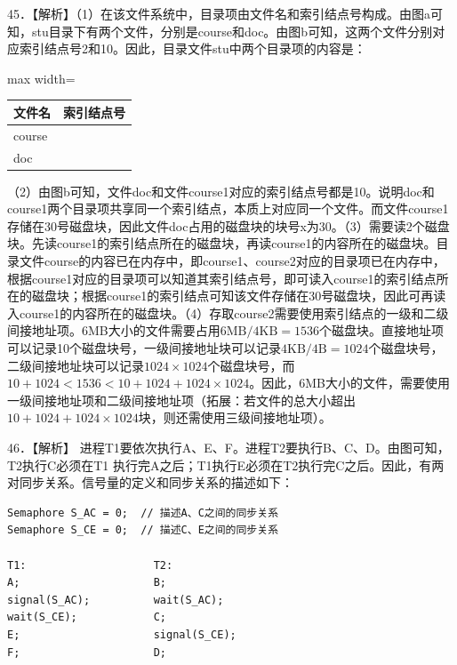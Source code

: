 \documentclass[UTF8,11pt]{ctexart}
\begin{document}
45．【解析】（1）在该文件系统中，目录项由文件名和索引结点号构成。由图a可知，stu目录下有两个文件，分别是course和doc。由图b可知，这两个文件分别对应索引结点号2和10。因此，目录文件stu中两个目录项的内容是：


\begin{center}\begin{adjustbox}{max width=\linewidth}\begin{tabular}{|>{\raggedright\arraybackslash}p{\dimexpr(\linewidth-4\tabcolsep-3\arrayrulewidth)/2\relax}|>{\raggedright\arraybackslash}p{\dimexpr(\linewidth-4\tabcolsep-3\arrayrulewidth)/2\relax}|}\hline
文件名 & 索引结点号\\\hline
course & 2\\\hline
doc & 10\\\hline\end{tabular}\end{adjustbox}\end{center}

（2）由图b可知，文件doc和文件course1对应的索引结点号都是10。说明doc和course1两个目录项共享同一个索引结点，本质上对应同一个文件。而文件course1存储在30号磁盘块，因此文件doc占用的磁盘块的块号x为30。（3）需要读2个磁盘块。先读course1的索引结点所在的磁盘块，再读course1的内容所在的磁盘块。目录文件course的内容已在内存中，即course1、course2对应的目录项已在内存中，根据course1对应的目录项可以知道其索引结点号，即可读入course1的索引结点所在的磁盘块；根据course1的索引结点可知该文件存储在30号磁盘块，因此可再读入course1的内容所在的磁盘块。（4）存取course2需要使用索引结点的一级和二级间接地址项。6MB大小的文件需要占用\(\displaystyle 6\mathrm{MB}/4\mathrm{KB}=1536\)个磁盘块。直接地址项可以记录10个磁盘块号，一级间接地址块可以记录\(\displaystyle 4\mathrm{KB}/4\mathrm{B}=1024\)个磁盘块号，二级间接地址块可以记录\(\displaystyle 1024\times1024\)个磁盘块号，而\(\displaystyle 10+1024<1536<10+1024+1024\times1024\)。因此，6MB大小的文件，需要使用一级间接地址项和二级间接地址项（拓展：若文件的总大小超出\(\displaystyle 10+1024+1024\times1024\)块，则还需使用三级间接地址项）。


46．【解析】 进程T1要依次执行A、E、F。进程T2要执行B、C、D。由图可知，T2执行C必须在T1 执行完A之后；T1执行E必须在T2执行完C之后。因此，有两对同步关系。信号量的定义和同步关系的描述如下：


\begin{Verbatim}[breaklines,breakanywhere,fontsize=\small]
Semaphore S_AC = 0;  // 描述A、C之间的同步关系
Semaphore S_CE = 0;  // 描述C、E之间的同步关系

T1:                    T2:
A;                     B;
signal(S_AC);          wait(S_AC);
wait(S_CE);            C;
E;                     signal(S_CE);
F;                     D;
\end{Verbatim}
\end{document}
